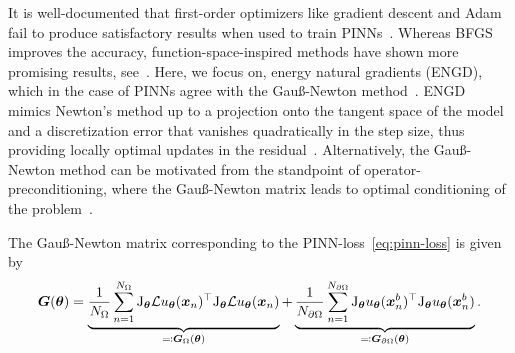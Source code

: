 It is well-documented that first-order optimizers like gradient descent and Adam fail to produce satisfactory results when used to train PINNs~\cite{?}. 
Whereas BFGS improves the accuracy, function-space-inspired methods have shown more promising results, see~\cite{?}.
Here, we focus on, energy natural gradients (ENGD), which in the case of PINNs agree with the Gauß-Newton method~\cite{muller2023achieving}. 
ENGD mimics Newton's method up to a projection onto the tangent space of the model and a discretization error that vanishes quadratically in the step size, thus providing locally optimal updates in the residual~\citep{muller2023achieving}. Alternatively, the Gauß-Newton method can be motivated from the standpoint of operator-preconditioning, where the Gauß-Newton matrix leads to optimal conditioning of the problem~\citep{de2023operator}. 

The Gauß-Newton matrix corresponding to the PINN-loss~\eqref{eq:pinn-loss} is given by 
\begin{equation}\label{eq:gramian}
  \mG(\vtheta) = %
  \underbrace{\frac1{{N_\Omega}} \sum_{n=1}^{N_\Omega} \jac_{\vtheta} \mathcal{L} u_\vtheta(\vx_n)^\top \jac_{\vtheta} \mathcal{L} u_\vtheta(\vx_n)}_{\eqqcolon \mG_\Omega(\vtheta)} + \underbrace{\frac1{{N_{\partial\Omega}}} \sum_{n=1}^{N_{\partial\Omega}} \jac_{\vtheta} u_\vtheta(\vx_n^b)^\top \jac_{\vtheta} u_\vtheta (\vx_n^b)}_{\eqqcolon \mG_{\partial\Omega}(\vtheta)}.
\end{equation}


